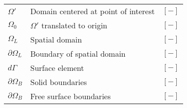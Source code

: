 \begin{longtable}{l|l|l}
$\Omega'$ & Domain centered at point of interest & $[-]$ \\
$\Omega_0$ & $\Omega'$ translated to origin & $[-]$ \\
$\Omega_L$ & Spatial domain & $[-]$ \\
$\partial\Omega_L$ & Boundary of spatial domain & $[-]$ \\
$d\Gamma$ & Surface element & $[-]$ \\
$\partial\Omega_B$ & Solid boundaries & $[-]$ \\
$\partial\Omega_B$ & Free surface boundaries & $[-]$ \\

\end{longtable}





\clearpage
\thispagestyle{empty}

\cleardoublepage
 \setcounter{page}{1}
\baselineskip 18pt